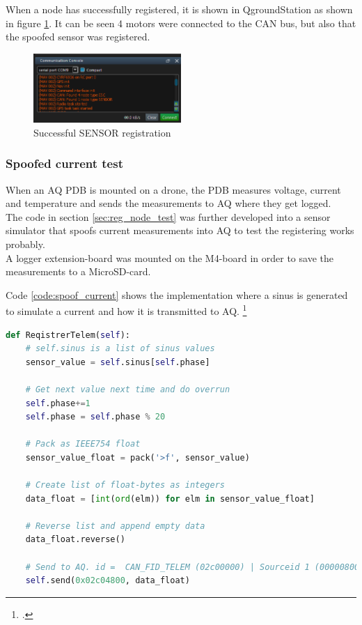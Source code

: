 When a node has successfully registered, it is shown in QgroundStation as shown in figure \ref{fig:successful_register}.
It can be seen 4 motors were connected to the CAN bus, but also that the spoofed sensor was registered.

\begin{figure}[H]
    \center
    \includegraphics[width=0.5\textwidth]{graphics/test_register_node.png}
    \caption{Successful SENSOR registration}
    \label{fig:successful_register}
\end{figure}

\subsubsection*{Spoofed current test}
When an AQ PDB is mounted on a drone, the PDB measures voltage, current and temperature and sends the measurements to AQ where they get logged.\\
The code in section \ref{sec:reg_node_test} was further developed into a sensor simulator that spoofs current measurements into AQ to test the registering works probably. \\
A logger extension-board was mounted on the M4-board in order to save the measurements to a MicroSD-card.

Code \ref{code:spoof_current} shows the implementation where a sinus is generated to simulate a current and how it is transmitted to AQ. \footcite{someguy2993}

\begin{lstlisting}[language = python, caption = Snippet spoofing current measurements into AQ, label=code:spoof_current]
def ReqistrerTelem(self):
	# self.sinus is a list of sinus values
	sensor_value = self.sinus[self.phase]

	# Get next value next time and do overrun
	self.phase+=1
	self.phase = self.phase % 20

	# Pack as IEEE754 float
	sensor_value_float = pack('>f', sensor_value)

	# Create list of float-bytes as integers
	data_float = [int(ord(elm)) for elm in sensor_value_float]

	# Reverse list and append empty data
	data_float.reverse()
	
	# Send to AQ. id =  CAN_FID_TELEM (02c00000) | Sourceid 1 (00000800) | CAN_SENSORS_PDB_BATA (00004000)
	self.send(0x02c04800, data_float)
\end{lstlisting}

